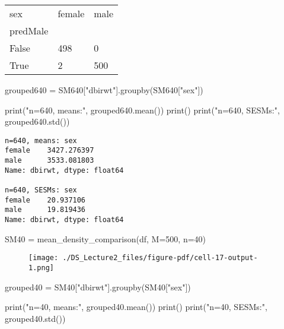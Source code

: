 \documentclass[
  letterpaper,
  DIV=11,
  numbers=noendperiod]{scrreprt}
\newenvironment{Shaded}{\begin{snugshade}}{\end{snugshade}}
\newcommand{\BuiltInTok}[1]{\textcolor[rgb]{0.00,0.23,0.31}{#1}}
\newcommand{\DecValTok}[1]{\textcolor[rgb]{0.68,0.00,0.00}{#1}}
\newcommand{\NormalTok}[1]{\textcolor[rgb]{0.00,0.23,0.31}{#1}}
\newcommand{\OperatorTok}[1]{\textcolor[rgb]{0.37,0.37,0.37}{#1}}
\newcommand{\StringTok}[1]{\textcolor[rgb]{0.13,0.47,0.30}{#1}}
\begin{document}
\begin{longtable}[]{@{}lll@{}}
\toprule()
sex & female & male \\
predMale & & \\
\midrule()
\endhead
False & 498 & 0 \\
True & 2 & 500 \\
\bottomrule()
\end{longtable}

\begin{Shaded}
\begin{Highlighting}[]
\NormalTok{grouped640 }\OperatorTok{=}\NormalTok{ SM640[}\StringTok{"dbirwt"}\NormalTok{].groupby(SM640[}\StringTok{"sex"}\NormalTok{])}

\BuiltInTok{print}\NormalTok{(}\StringTok{"n=640, means:"}\NormalTok{, grouped640.mean())}
\BuiltInTok{print}\NormalTok{()}
\BuiltInTok{print}\NormalTok{(}\StringTok{"n=640, SESMs:"}\NormalTok{, grouped640.std())}
\end{Highlighting}
\end{Shaded}

\begin{verbatim}
n=640, means: sex
female    3427.276397
male      3533.081803
Name: dbirwt, dtype: float64

n=640, SESMs: sex
female    20.937106
male      19.819436
Name: dbirwt, dtype: float64
\end{verbatim}

\begin{Shaded}
\begin{Highlighting}[]
\NormalTok{SM40 }\OperatorTok{=}\NormalTok{ mean\_density\_comparison(df, M}\OperatorTok{=}\DecValTok{500}\NormalTok{, n}\OperatorTok{=}\DecValTok{40}\NormalTok{)}
\end{Highlighting}
\end{Shaded}

\begin{figure}[H]

{\centering \texttt{[image: ./DS\_Lecture2\_files/figure-pdf/cell-17-output-1.png]}

}

\end{figure}

\begin{Shaded}
\begin{Highlighting}[]
\NormalTok{grouped40 }\OperatorTok{=}\NormalTok{ SM40[}\StringTok{"dbirwt"}\NormalTok{].groupby(SM40[}\StringTok{"sex"}\NormalTok{])}

\BuiltInTok{print}\NormalTok{(}\StringTok{"n=40, means:"}\NormalTok{, grouped40.mean())}
\BuiltInTok{print}\NormalTok{()}
\BuiltInTok{print}\NormalTok{(}\StringTok{"n=40, SESMs:"}\NormalTok{, grouped40.std())}
\end{Highlighting}
\end{Shaded}
\end{document}
